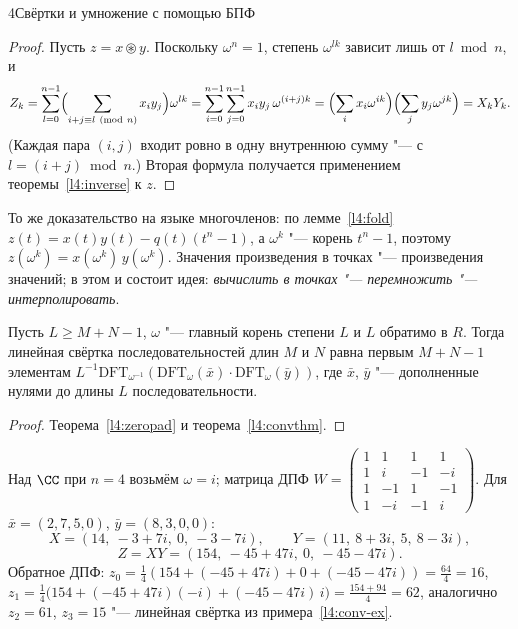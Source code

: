 \begin{lecture}{4}{Свёртки и умножение с помощью БПФ}
\begin{proof}
Пусть $z = x \circledast y$. Поскольку $\omega^n = 1$, степень $\omega^{lk}$ зависит лишь от
$l \bmod n$, и
\[
  Z_k = \sum_{l=0}^{n-1} \Bigl(\sum_{i + j \equiv l\ (\mathrm{mod}\ n)} x_i y_j\Bigr) \omega^{lk}
  = \sum_{i=0}^{n-1} \sum_{j=0}^{n-1} x_i y_j\, \omega^{(i + j)k}
  = \Bigl(\sum_i x_i \omega^{ik}\Bigr) \Bigl(\sum_j y_j \omega^{jk}\Bigr) = X_k Y_k .
\]
(Каждая пара $(i, j)$ входит ровно в одну внутреннюю сумму "--- с $l = (i + j) \bmod n$.)
Вторая формула получается применением теоремы~\ref{l4:inverse} к $z$.
\end{proof}

\begin{remark}
То же доказательство на языке многочленов: по лемме~\ref{l4:fold}
$z(t) = x(t)y(t) - q(t)(t^n - 1)$, а $\omega^k$ "--- корень $t^n - 1$, поэтому
$z(\omega^k) = x(\omega^k)\,y(\omega^k)$. Значения произведения в точках "--- произведения
значений; в этом и состоит идея: \emph{вычислить в точках "--- перемножить "--- интерполировать}.
\end{remark}

\begin{corollary}\label{l4:linconv}
Пусть $L \ge M + N - 1$, $\omega$ "--- главный корень степени $L$ и $L$ обратимо в $R$. Тогда
линейная свёртка последовательностей длин $M$ и $N$ равна первым $M + N - 1$ элементам
$L^{-1} \mathrm{DFT}_{\omega^{-1}}(\mathrm{DFT}_\omega(\bar x) \cdot \mathrm{DFT}_\omega(\bar y))$,
где $\bar x$, $\bar y$ "--- дополненные нулями до длины $L$ последовательности.
\end{corollary}

\begin{proof}
Теорема~\ref{l4:zeropad} и теорема~\ref{l4:convthm}.
\end{proof}

\begin{example}\label{l4:dft-c}
Над $\CC$ при $n = 4$ возьмём $\omega = i$; матрица ДПФ
$W = \left(\begin{smallmatrix} 1 & 1 & 1 & 1\\ 1 & i & -1 & -i\\ 1 & -1 & 1 & -1\\ 1 & -i & -1 & i
\end{smallmatrix}\right)$. Для $\bar x = (2, 7, 5, 0)$, $\bar y = (8, 3, 0, 0)$:
\[
  X = (14,\ -3 + 7i,\ 0,\ -3 - 7i), \qquad Y = (11,\ 8 + 3i,\ 5,\ 8 - 3i),
\]
\[
  Z = XY = (154,\ -45 + 47i,\ 0,\ -45 - 47i).
\]
Обратное ДПФ: $z_0 = \frac14 (154 + (-45 + 47i) + 0 + (-45 - 47i)) = \frac{64}{4} = 16$,
$z_1 = \frac14\bigl(154 + (-45 + 47i)(-i) + (-45 - 47i)\,i\bigr) = \frac{154 + 94}{4} = 62$,
аналогично $z_2 = 61$, $z_3 = 15$ "--- линейная свёртка из примера~\ref{l4:conv-ex}.
\end{example}


\end{lecture}
